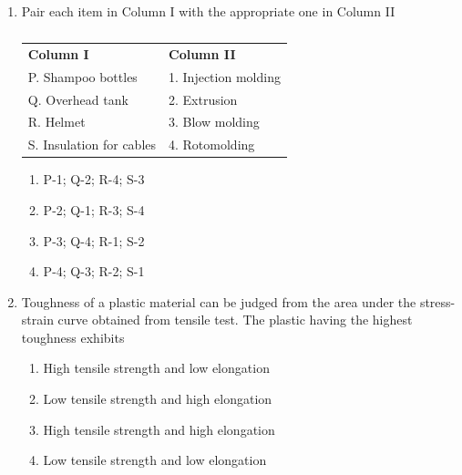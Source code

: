 \documentclass[a4paper,10pt]{article}
\begin{document}
\begin{enumerate}
\begin{multicols}{2}
\begin{enumerate}
\item Random
\item Branched
\item Block
\item Alternating
\end{enumerate}
\end{multicols}

\item Pair each item in Column I with the appropriate one in Column II
\begin{table}[H]
\centering
\begin{tabular}{ll}
\textbf{Column I} & \textbf{Column II} \\
P. Shampoo bottles & 1. Injection molding \\
Q. Overhead tank & 2. Extrusion \\
R. Helmet & 3. Blow molding \\
S. Insulation for cables & 4. Rotomolding \\
\end{tabular}
\caption*{}
\label{tab:q12_poly}
\end{table}
\hfill{}

\begin{multicols}{2}
\begin{enumerate}
\item P-1; Q-2; R-4; S-3
\item P-2; Q-1; R-3; S-4
\item P-3; Q-4; R-1; S-2
\item P-4; Q-3; R-2; S-1
\end{enumerate}
\end{multicols}

\item Toughness of a plastic material can be judged from the area under the stress-strain curve obtained from tensile test. The plastic having the highest toughness exhibits
\hfill{}

\begin{multicols}{2}
\begin{enumerate}
\item High tensile strength and low elongation
\item Low tensile strength and high elongation
\item High tensile strength and high elongation
\item Low tensile strength and low elongation
\end{enumerate}
\end{multicols}


\end{enumerate}
\end{document}

